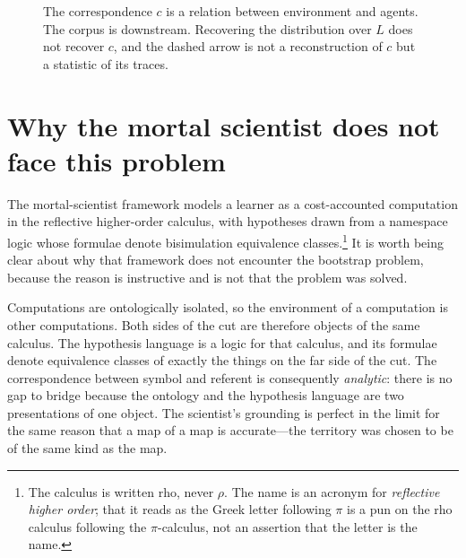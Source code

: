 \documentclass[11pt,a4paper]{article}
\theoremstyle{definition}
\theoremstyle{plain}
\theoremstyle{remark}
\newcommand{\rc}{\textup{rho}}
\begin{document}
\begin{figure}[t]
\centering
{}
\caption{The correspondence $c$ is a relation between environment and agents. The corpus
is downstream. Recovering the distribution over $L$ does not recover $c$, and the dashed
arrow is not a reconstruction of $c$ but a statistic of its traces.}
\label{fig:locus}
\end{figure}

\section{Why the mortal scientist does not face this problem}
\label{sec:scientist}

The mortal-scientist framework models a learner as a cost-accounted computation in the
reflective higher-order calculus, with hypotheses drawn from a namespace logic whose
formulae denote bisimulation equivalence classes.\footnote{The calculus is written
\rc{}, never $\rho$. The name is an acronym for \emph{reflective higher order}; that it
reads as the Greek letter following $\pi$ is a pun on the rho calculus following the
$\pi$-calculus, not an assertion that the letter is the name.} It is worth being clear
about why that
framework does not encounter the bootstrap problem, because the reason is instructive and
is not that the problem was solved.

Computations are ontologically isolated, so the environment of a computation is other
computations. Both sides of the cut are therefore objects of the same calculus. The
hypothesis language is a logic for that calculus, and its formulae denote equivalence
classes of exactly the things on the far side of the cut. The correspondence between
symbol and referent is consequently \emph{analytic}: there is no gap to bridge because
the ontology and the hypothesis language are two presentations of one object. The
scientist's grounding is perfect in the limit for the same reason that a map of a map is
accurate---the territory was chosen to be of the same kind as the map.
\end{document}
